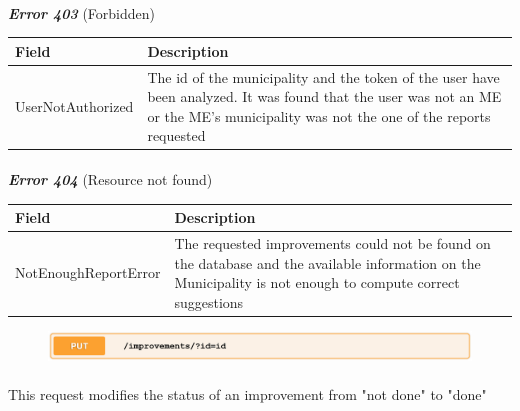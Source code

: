 						\paragraph{}
							\textcolor{myRed}{\textit{\textbf{Error 403}}} (Forbidden)
							\vspace{-2mm}
							\begin{table}[!h]
								\begin{tabular}{L{0.3\textwidth}L{0.62\textwidth}}
									\toprule
									\textbf{Field} & \textbf{Description} \\
									\midrule
								  	UserNotAuthorized & The id of the municipality and the token of the user have been analyzed. It was found that the user was not an ME or the ME's  municipality was not the one of the reports requested  \\
								 	\bottomrule
								\end{tabular}
							\end{table}
						\vspace{-5mm}
						\paragraph{}
							\textcolor{myRed}{\textit{\textbf{Error 404}}} (Resource not found)
							\vspace{-2mm}
							\begin{table}[!h]
								\begin{tabular}{L{0.3\textwidth}L{0.62\textwidth}}
									\toprule
									\textbf{Field} & \textbf{Description} \\
									\midrule
								  	NotEnoughReportError & The requested improvements could not be found on the database and the available information on the Municipality is not enough to compute correct suggestions \\
								 	\bottomrule
								\end{tabular}
							\end{table}
						
						\clearpage
						\begin{figure}[!h]
							\includegraphics[width=\textwidth]{images/Restful/DoImprovement}
						\end{figure}
						\paragraph{}
						\vspace{-7.5mm}
						This request modifies the status of an improvement from "not done" to "done"
